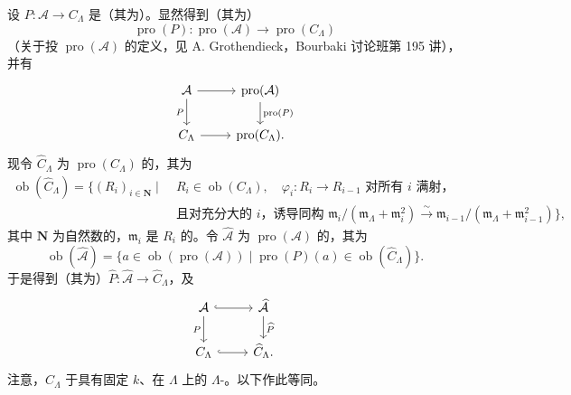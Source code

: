 设 $P:\mathcal A\to C_\Lambda$ 是（其为）。显然得到（其为）
\[\operatorname{pro}(P):\operatorname{pro}(\mathcal A)\longrightarrow\operatorname{pro}(C_\Lambda)\]
（关于投 $\operatorname{pro}(\mathcal A)$ 的定义，见 A. Grothendieck，Bourbaki 讨论班第 195 讲），并有
\[\begin{tikzcd}\mathcal A\arrow[r]\arrow[d,"P"']&\operatorname{pro}(\mathcal A)\arrow[d,"\operatorname{pro}(P)"]\\C_\Lambda\arrow[r]&\operatorname{pro}(C_\Lambda).\end{tikzcd}\]
现令 $\widehat C_\Lambda$ 为 $\operatorname{pro}(C_\Lambda)$ 的，其为
\[\begin{split}
\operatorname{ob}(\widehat C_\Lambda)=\{(R_i)_{i\in\mathbf N}\mid\;&R_i\in\operatorname{ob}(C_\Lambda),\quad
\varphi_i:R_i\to R_{i-1}\text{ 对所有 }i\text{ 满射，}\\
&\text{且对充分大的 }i\text{，诱导同构 }
\mathfrak m_i/(\mathfrak m_\Lambda+\mathfrak m_i^2)
\xrightarrow\sim\mathfrak m_{i-1}/(\mathfrak m_\Lambda+\mathfrak m_{i-1}^2)\},
\end{split}\]
其中 $\mathbf N$ 为自然数的，$\mathfrak m_i$ 是 $R_i$ 的。令 $\widehat{\mathcal A}$ 为 $\operatorname{pro}(\mathcal A)$ 的，其为
\[\operatorname{ob}(\widehat{\mathcal A})=
\{a\in\operatorname{ob}(\operatorname{pro}(\mathcal A))\mid
\operatorname{pro}(P)(a)\in\operatorname{ob}(\widehat C_\Lambda)\}.\]
于是得到（其为）$\widehat P:\widehat{\mathcal A}\to\widehat C_\Lambda$，及
\[\begin{tikzcd}\mathcal A\arrow[r,hook]\arrow[d,"P"']&\widehat{\mathcal A}\arrow[d,"\widehat P"]\\C_\Lambda\arrow[r,hook]&\widehat C_\Lambda.\end{tikzcd}\]
注意，$\widehat C_\Lambda$ 于具有固定 $k$、在 $\Lambda$ 上的 $\Lambda$-。以下作此等同。

